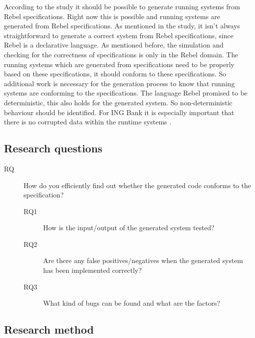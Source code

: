 According to the study \cite[p.3]{stoelcase} it should be possible to generate
running systems from Rebel specifications. Right now this is possible and
running systems are generated from Rebel specifications. As mentioned in the
study, it isn't always straightforward to generate a correct system from Rebel
specifications, since Rebel is a declarative language.
As mentioned before, the simulation and checking for the correctness of
specifications is only in the Rebel domain. The running systems which are
generated from specifications need to be properly based on these specifications,
it should conform to these specifications. So additional work is necessary for
the generation process to know that running systems are conforming to the
specifications. The language Rebel promised to be deterministic, this also holds
for the generated system. So non-deterministic behaviour should be identified.
For ING Bank it is especially important that there is no corrupted data within
the runtime systems .

\subsection{Research questions}
\label{sec:research-questions}

\begin{description}
  \item [RQ] How do you efficiently find out whether the generated code conforms
  to the specification?

  \begin{description}
    \item [RQ1] How is the input/output of the generated system tested?
    \item [RQ2] Are there any false positives/negatives when the generated
    system has been implemented correctly?
    \item [RQ3] What kind of bugs can be found and what are the factors?
  \end{description}

\end{description}

\subsection{Research method}
\label{sec:research-method}

